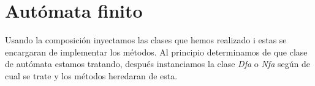 \documentclass{article}
\begin{document}
    \section{Autómata finito}\label{sec:autómata-finito}
    Usando la composición inyectamos las clases que hemos realizado i estas se encargaran de implementar los métodos.
    Al principio determinamos de que clase de autómata estamos tratando, después instanciamos la clase \textit{Dfa} o \textit{Nfa} según de cual se trate y los métodos heredaran de esta.
\end{document}
